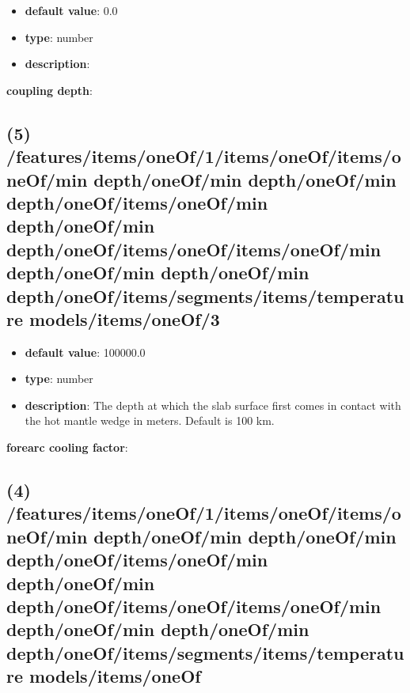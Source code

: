 \begin{itemize}[leftmargin=9em]\item {\bf default value}: 0.0
\item {\bf type}: number
\item {\bf description}: 
\end{itemize}\item {\bf coupling depth}: \subsection{(5) /features/items/oneOf/1/items/oneOf/items/oneOf/min depth/oneOf/min depth/oneOf/min depth/oneOf/items/oneOf/min depth/oneOf/min depth/oneOf/items/oneOf/items/oneOf/min depth/oneOf/min depth/oneOf/min depth/oneOf/items/segments/items/temperature models/items/oneOf/3}
\begin{itemize}[leftmargin=5em]\item {\bf default value}: 100000.0
\item {\bf type}: number
\item {\bf description}: The depth at which the slab surface first comes in contact with the hot mantle wedge in meters. Default is 100 km.
\end{itemize}\item {\bf forearc cooling factor}: \subsection{(4) /features/items/oneOf/1/items/oneOf/items/oneOf/min depth/oneOf/min depth/oneOf/min depth/oneOf/items/oneOf/min depth/oneOf/min depth/oneOf/items/oneOf/items/oneOf/min depth/oneOf/min depth/oneOf/min depth/oneOf/items/segments/items/temperature models/items/oneOf}
